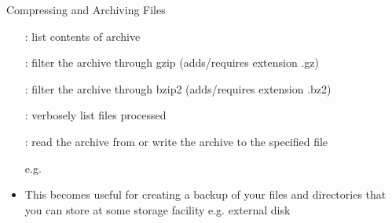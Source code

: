 \documentclass[10pt,t]{beamer}
\begin{document}
\begin{frame}{Compressing and Archiving Files}
\begin{itemize}
    \item[] : list contents of archive
    \item[] : filter the archive through gzip (adds/requires extension .gz)
    \item[] : filter the archive through bzip2 (adds/requires extension .bz2)
    \item[] : verbosely list files processed
    \item[] : read the archive from or write the archive to the specified file
    \item[e.g.] 
    \item This becomes useful for creating a backup of your files and directories that you can store at some storage facility e.g. external disk
  \end{itemize}
\end{frame}
\end{document}
